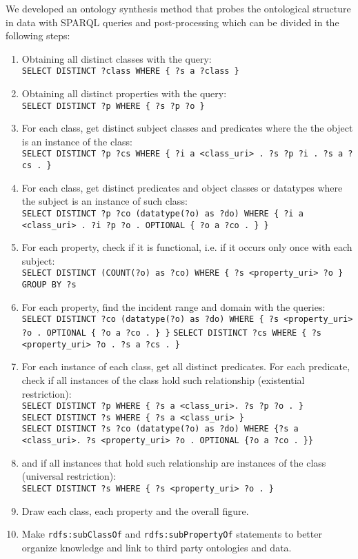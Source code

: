 \documentclass[review]{elsarticle}
\begin{document}
We developed an ontology synthesis method that probes the ontological structure in data with
SPARQL queries and post-processing which can be divided in the following steps:
\begin{enumerate}[leftmargin=0cm]
    \item Obtaining all distinct classes with the query:\\
        \texttt{SELECT DISTINCT ?class WHERE \{ ?s a ?class \}}
    \item Obtaining all distinct properties with the query:\\
        \texttt{SELECT DISTINCT ?p WHERE \{ ?s ?p ?o \}}
    \item For each class, get distinct subject classes and predicates where the
        the object is an instance of the class:\\
        \texttt{SELECT DISTINCT ?p ?cs WHERE \{ ?i a <class\_uri> . ?s ?p ?i . ?s
        a ?cs . \}}
    \item For each class, get distinct predicates and object classes or
        datatypes where the subject is an instance of such class:\\
        \texttt{SELECT DISTINCT ?p ?co (datatype(?o) as ?do) WHERE \{ ?i
                a <class\_uri> . ?i ?p ?o . OPTIONAL \{ ?o a ?co . \} \}}
    \item For each property, check if it is functional, i.e. if it
        occurs only once with each subject:\\
        \texttt{SELECT DISTINCT (COUNT(?o) as ?co) WHERE \{ ?s
            <property\_uri> ?o \} GROUP BY ?s}
    \item For each property, find the incident range and domain with the
        queries:\\
        \texttt{SELECT DISTINCT ?co (datatype(?o) as ?do) WHERE \{ ?s
                <property\_uri> ?o . OPTIONAL \{ ?o a ?co . \} \}}
        \texttt{SELECT DISTINCT ?cs WHERE \{ ?s <property\_uri> ?o . ?s a ?cs . \}}
    \item For each instance of each class, get all distinct predicates.
        For each predicate, check if all instances of the class
        hold such relationship (existential restriction):\\
        \texttt{SELECT DISTINCT ?p WHERE \{ ?s a <class\_uri>. ?s ?p ?o
        . \}}\\
        \texttt{SELECT DISTINCT ?s WHERE \{ ?s a <class\_uri> \}}\\
        \texttt{SELECT DISTINCT ?s ?co  (datatype(?o) as ?do) WHERE \{?s
                a <class\_uri>. ?s <property\_uri> ?o . OPTIONAL \{?o a ?co . \}\}}
    \item and if all instances that hold such relationship are instances of the class
        (universal restriction):\\
        \texttt{SELECT DISTINCT ?s WHERE \{ ?s <property\_uri> ?o . \}}
    \item Draw each class, each property and the overall figure.
    \item Make \texttt{rdfs:subClassOf} and \texttt{rdfs:subPropertyOf}
        statements to better organize knowledge and link to third party
        ontologies and data.
\end{enumerate}
 
\end{document}
